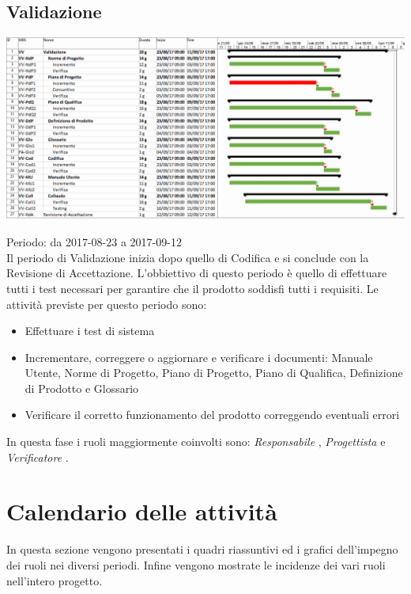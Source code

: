 \subsection{Validazione}

\begin{center}
  \includegraphics[scale=0.18]{img/6-VA.png}
\end{center}

Periodo: da 2017-08-23 a 2017-09-12 \\
Il periodo di Validazione inizia dopo quello di Codifica e si conclude con la Revisione
di Accettazione.
L'obbiettivo di questo periodo è quello di effettuare tutti i test necessari per garantire
che il prodotto soddisfi tutti i requisiti. 
Le attività previste per questo periodo sono:
\begin{itemize}
\item Effettuare i test di sistema
\item Incrementare, correggere o aggiornare e verificare i documenti: Manuale Utente, Norme di Progetto, Piano di Progetto, Piano di Qualifica, Definizione di Prodotto e Glossario
\item Verificare il corretto funzionamento del prodotto correggendo eventuali errori
\end{itemize}

In questa fase i ruoli maggiormente coinvolti sono:  \emph{Responsabile} ,  \emph{Progettista} 
e  \emph{Verificatore} .

\section{Calendario delle attività}
In questa sezione vengono presentati i quadri riassuntivi ed i grafici dell’impegno dei ruoli nei diversi periodi. Infine vengono mostrate le incidenze dei vari ruoli nell’intero progetto.


